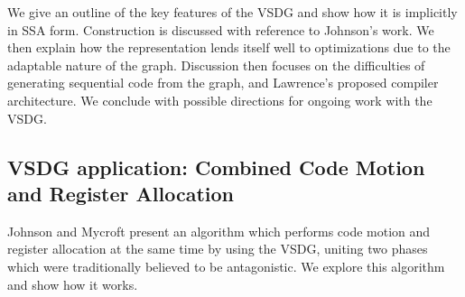 We give an outline of the key features of the VSDG and show how it is implicitly in SSA form. Construction is discussed with reference to Johnson's work. We then explain how the representation lends itself well to optimizations due to the adaptable nature of the graph. Discussion then focuses on the difficulties of generating sequential code from the graph\cite{DBLP:conf/pdpta/Upton03}, and Lawrence's proposed compiler architecture. We conclude with possible directions for ongoing work with the VSDG.

\subsection*{VSDG application: Combined Code Motion and Register Allocation}

Johnson and Mycroft \cite{johnson-combined} present an algorithm which performs code motion and register allocation at the same time by using the VSDG, uniting two phases which were traditionally believed to be antagonistic. We explore this algorithm and show how it works.


